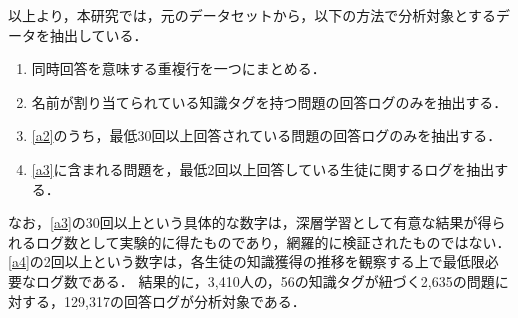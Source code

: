 以上より，本研究では，元のデータセットから，以下の方法で分析対象とするデータを抽出している．
\begin{enumerate}
	\item 同時回答を意味する重複行を一つにまとめる．\label{a1}
	\item 名前が割り当てられている知識タグを持つ問題の回答ログのみを抽出する．\label{a2}
	\item \ref{a2}のうち，最低30回以上回答されている問題の回答ログのみを抽出する．\label{a3}
	\item \ref{a3}に含まれる問題を，最低2回以上回答している生徒に関するログを抽出する．\label{a4}
\end{enumerate}

なお，\ref{a3}の30回以上という具体的な数字は，深層学習として有意な結果が得られるログ数として実験的に得たものであり，網羅的に検証されたものではない．
\ref{a4}の2回以上という数字は，各生徒の知識獲得の推移を観察する上で最低限必要なログ数である．
結果的に，3,410人の，56の知識タグが紐づく2,635の問題に対する，129,317の回答ログが分析対象である．

\begin{figure}[t]
\begin{center}
\end{center}
\end{figure}


